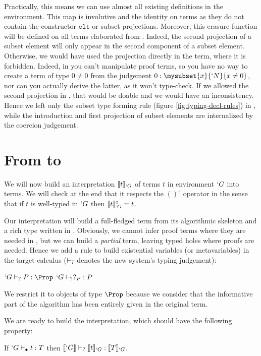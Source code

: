 \documentclass{llncs}
\def\id#1{\texttt{#1}}
\begin{document}
Practically, this means we can use almost all existing definitions in the
\Coq environment. This map is involutive and
the identity on \Russell terms as they do not contain the constructor
$\id{elt}$ or subset projections. Moreover, this erasure function will be
defined on all \Coq terms elaborated from \Russell.
Indeed, the second projection of a
subset element will only appear in the second component of a subset
element. Otherwise, we would have used the projection directly in the
\Russell{} term, where it is forbidden.
Indeed, in \PVS{} you can't manipulate proof terms, so you have no way to create a
term of type $0 \neq 0$ from the judgement $0 : \mysubset{x}{`N}{x \neq
  0}$, nor can you actually derive the latter, as it won't type-check.
If we allowed the second projection in \Russell, that would be doable
and we would have an inconsistency.
Hence we left only the subset type forming rule (figure
\vref{fig:typing-decl-rules}) in \Russell, while the introduction and
first projection of subset elements are internalized by the coercion judgement.

\section{From \lng{} to \CICq{}}
\label{sec:Translation}
We will now build an interpretation
$\llbracket t \rrbracket_{`G}$ of \Russell terms $t$ in environment $`G$ into \CIC
terms. We will check at the end that it respects the $()^{\circ}$ operator
in the sense that if $t$ is well-typed in $`G$ then $\llbracket t \rrbracket_{`G}^{\circ} = t$.

Our interpretation will build a full-fledged \CIC term from its
algorithmic skeleton and a rich type written in \Russell. Obviously, we
cannot infer proof terms where they are needed in \CIC, but we can build
a \emph{partial} term, leaving typed holes where proofs are
needed. Hence we add a rule to build existential variables (or
metavariables) in the target calculus ($\vdash_{?}$ denotes the new system's typing judgement):

\begin{center}
  \vspace{-1.7em}
  \UAX{}
  {$`G \typeq P : \Prop$}
  {$`G \vdash_{?} ?_{P} : P$}
  {}
  \DP
  \vspace{-1.7em}
\end{center}
We restrict it to objects of type $\Prop$ because we consider that the
informative part of the algorithm has been entirely given in the
original term. 

We are ready to build the interpretation, which should have the following property:
\begin{proposition}
  If $`G \vdash_{\bullet} t : T$ then $\llbracket `G \rrbracket \vdash_{?} \llbracket t \rrbracket_{`G} : \llbracket T \rrbracket_{`G}$.
\end{proposition}
\end{document}
